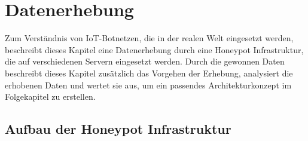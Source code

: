 \section{Datenerhebung}

Zum Verständnis von IoT-Botnetzen, die in der realen Welt eingesetzt werden, beschreibt dieses Kapitel eine Datenerhebung durch eine Honeypot Infrastruktur, die auf verschiedenen Servern eingesetzt werden. Durch die gewonnen Daten beschreibt dieses Kapitel zusätzlich das Vorgehen der Erhebung, analysiert die erhobenen Daten und wertet sie aus, um ein passendes Architekturkonzept im Folgekapitel zu erstellen. 

\subsection{Aufbau der Honeypot Infrastruktur}

